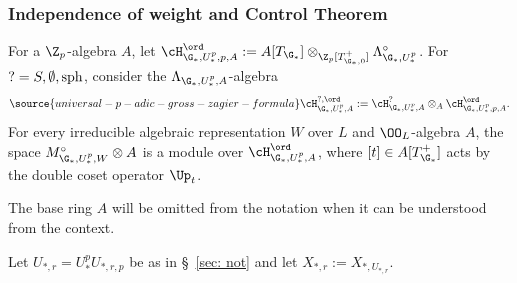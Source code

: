 \subsubsection{Independence of weight and Control Theorem}
For  a $\Z_{p}$-algebra $A$, let  $\cH_{\G_{*}, U^{p}_{*}, p, A}^{\ord}:= A[T_{\G_{*}}]\otimes_{\Z_{p}[T^{+}_{\G_{*},0}]}\Lambda^{\circ}_{\G_{*}, U^{p}_{*}}$.
For $?= S,\emptyset, {\rm sph}$, consider the $\Lambda_{\G_{*}, U^{p}_{*},A}$-algebra
\begin{align} \label{hecke}
\source{universal-p-adic-gross-zagier-formula}
\cH_{\G_{*}, U^{p}_{*},A}^{?, \ord}:= \cH^{?}_{\G_{*}, U^{p}_{*}, A} \otimes_{A} \cH_{\G_{*}, U^{p}_{*}, p, A}^{\ord}.
\end{align}
For every irreducible algebraic representation $W$ over $L$ and $\OO_{L}$-algebra $A$, the space $M^{\circ}_{\G_{*}, U_{*}^{p}, W}\otimes A$ is  a module over $\cH^{\ord}_{\G_{*}, U^{p}_{*},A}$, where $[t]\in A[T_{\G_{*}}^{+}]$ acts by the double coset operator $\Up_{t}$.

The base ring $A$ will be omitted from the notation when it can be understood from the context.

Let $U_{*, r}=U^{p}_{*}U_{*, r, p}$ be as in \S~\ref{sec: not} and let $X_{*, r}:=X_{*, U_{*,r}}$.











